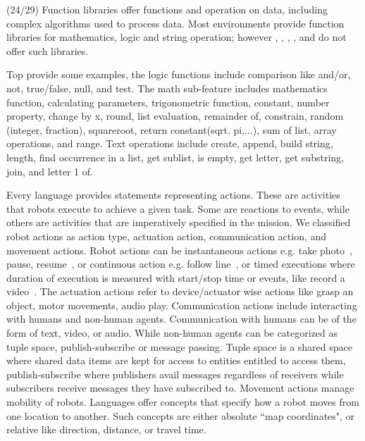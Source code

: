 \parhead{\ffunctionlib} (24/29) Function libraries offer functions and operation on data, including complex algorithms used to process data. Most environments provide function libraries for mathematics, logic and string operation; however \missionlab, \flyaq, \aseba, \codelab, and \tello do not offer such libraries. 

Top provide some examples, the logic functions include comparison like and/or, not, true/false, null, and test. The math sub-feature includes mathematics function, calculating parameters, trigonometric function, constant, number property, change by x, round, list evaluation, remainder of, constrain, random (integer, fraction), squareroot, return constant(sqrt, pi,...), sum of list, array operations, and range. Text operations include create, append, build string, length, find occurrence in a list, get sublist, is empty, get letter, get substring, join, and letter 1 of.  %

 
\parhead{\factions} Every language provides statements representing actions. These are activities that robots execute to achieve a given task. Some are reactions to events, while others are activities that are imperatively specified in the mission. We classified robot actions as action type, actuation action, communication action, and movement actions. Robot actions  can be instantaneous actions e.g. take photo~\cite{FLYAQ}, pause, resume~\cite{PICAXE}, or continuous action e.g. follow line~\cite{LEGO,Sphero}, or timed executions where duration of execution is measured with start/stop time or events, like record a video~\cite{FLYAQ}. The actuation actions refer to device/actuator wise actions like grasp an object, motor movements, audio play. Communication actions include interacting with humans and non-human agents.  Communication with humans can be of the form of text, video, or audio. While non-human agents can  be categorized as tuple space, publish-subscribe or message passing. Tuple space is a shared space where shared data items are kept for access to entities entitled to access them, publish-subscribe where publishers avail messages regardless of receivers while subscribers receive messages they have subscribed to.
Movement actions manage mobility of robots. Languages offer concepts that specify how a robot moves from one location to another. Such  concepts are either absolute ``map coordinates", or relative like direction, distance, or travel time.\\

